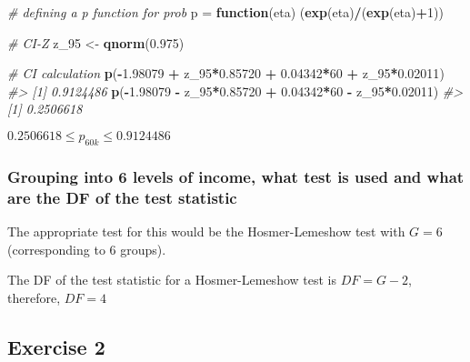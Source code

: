 \documentclass[]{article}
\newenvironment{Shaded}{\begin{snugshade}}{\end{snugshade}}
\newcommand{\CommentTok}[1]{\textcolor[rgb]{0.56,0.35,0.01}{\textit{#1}}}
\newcommand{\ControlFlowTok}[1]{\textcolor[rgb]{0.13,0.29,0.53}{\textbf{#1}}}
\newcommand{\DecValTok}[1]{\textcolor[rgb]{0.00,0.00,0.81}{#1}}
\newcommand{\FloatTok}[1]{\textcolor[rgb]{0.00,0.00,0.81}{#1}}
\newcommand{\KeywordTok}[1]{\textcolor[rgb]{0.13,0.29,0.53}{\textbf{#1}}}
\newcommand{\NormalTok}[1]{#1}
\newcommand{\OperatorTok}[1]{\textcolor[rgb]{0.81,0.36,0.00}{\textbf{#1}}}
\newcommand{\StringTok}[1]{\textcolor[rgb]{0.31,0.60,0.02}{#1}}
\begin{document}
\begin{Shaded}
\begin{Highlighting}[]
\CommentTok{# defining a p function for prob}
\NormalTok{p =}\StringTok{ }\ControlFlowTok{function}\NormalTok{(eta) (}\KeywordTok{exp}\NormalTok{(eta)}\OperatorTok{/}\NormalTok{(}\KeywordTok{exp}\NormalTok{(eta)}\OperatorTok{+}\DecValTok{1}\NormalTok{))}

\CommentTok{# CI-Z}
\NormalTok{z_}\DecValTok{95}\NormalTok{ <-}\StringTok{ }\KeywordTok{qnorm}\NormalTok{(}\FloatTok{0.975}\NormalTok{)}

\CommentTok{# CI calculation}
\KeywordTok{p}\NormalTok{(}\OperatorTok{-}\FloatTok{1.98079} \OperatorTok{+}\StringTok{ }\NormalTok{z_}\DecValTok{95}\OperatorTok{*}\FloatTok{0.85720} \OperatorTok{+}\StringTok{ }\FloatTok{0.04342}\OperatorTok{*}\DecValTok{60} \OperatorTok{+}\StringTok{ }\NormalTok{z_}\DecValTok{95}\OperatorTok{*}\FloatTok{0.02011}\NormalTok{)}
\CommentTok{#> [1] 0.9124486}
\KeywordTok{p}\NormalTok{(}\OperatorTok{-}\FloatTok{1.98079} \OperatorTok{-}\StringTok{ }\NormalTok{z_}\DecValTok{95}\OperatorTok{*}\FloatTok{0.85720} \OperatorTok{+}\StringTok{ }\FloatTok{0.04342}\OperatorTok{*}\DecValTok{60} \OperatorTok{-}\StringTok{ }\NormalTok{z_}\DecValTok{95}\OperatorTok{*}\FloatTok{0.02011}\NormalTok{)}
\CommentTok{#> [1] 0.2506618}
\end{Highlighting}
\end{Shaded}

\(0.2506618 \leq p_{60k} \leq 0.9124486\)

\hypertarget{grouping-into-6-levels-of-income-what-test-is-used-and-what-are-the-df-of-the-test-statistic}{%
\subsubsection{Grouping into 6 levels of income, what test is used and
what are the DF of the test
statistic}\label{grouping-into-6-levels-of-income-what-test-is-used-and-what-are-the-df-of-the-test-statistic}}

The appropriate test for this would be the Hosmer-Lemeshow test with
\(G=6\) (corresponding to 6 groups).

The DF of the test statistic for a Hosmer-Lemeshow test is \(DF=G-2\),
therefore, \(DF = 4\)

\hypertarget{exercise-2}{%
\subsection{Exercise 2}\label{exercise-2}}
\end{document}
